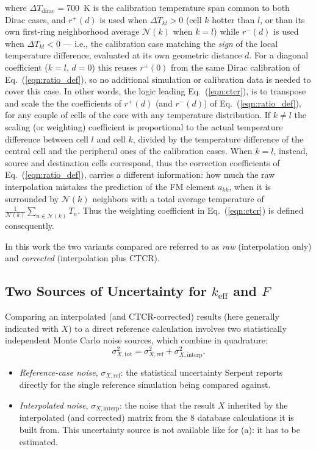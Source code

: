 \documentclass{style/nseJournal}
\begin{document}
where $\Delta T_{\text{dirac}} = 700$~K is the calibration temperature span common to both Dirac cases, and $r^{+}(d)$ is used when $\Delta T_{kl}>0$ (cell $k$ hotter than $l$, or than its own first-ring neighborhood average $\mathcal{N}(k)$ when $k=l$) while $r^{-}(d)$ is used when $\Delta T_{kl}<0$ --- i.e., the calibration case matching the \emph{sign} of the local temperature difference, evaluated at its own geometric distance $d$. For a diagonal coefficient ($k=l$, $d=0$) this reuses $r^{\pm}(0)$ from the same Dirac calibration of Eq.~(\ref{eqn:ratio_def}), so no additional simulation or calibration data is needed to cover this case.
In other words, the logic leading Eq.~(\ref{eqn:ctcr}), is to transpose and scale the the coefficients of $r^+(d)$ (and $r^-(d)$) of Eq.~(\ref{eqn:ratio_def}), for any couple of cells of the core with any temperature distribution. If $k\neq l$ the scaling (or weighting) coefficient is proportional to the actual temperature difference between cell $l$ and cell $k$, divided by the temperature difference of the central cell and the peripheral ones of the calibration cases. When $k=l$, instead, source and destination cells correspond, thus the correction coefficients of Eq.~(\ref{eqn:ratio_def}), carries a different information: how much the raw interpolation mistakes the prediction of the FM element $a_{kk}$, when it is surrounded by $\mathcal{N}(k)$ neighbors with a total average temperature of $\frac{1}{\mathcal{N}(k)} \displaystyle\sum_{n\in\mathcal{N}(k)}T_n$. Thus the weighting coefficient in Eq.~(\ref{eqn:ctcr}) is defined consequently. 

In this work the two variants compared are referred to as \emph{raw} (interpolation only) and \emph{corrected} (interpolation plus CTCR).


\subsection{Two Sources of Uncertainty for $k_\text{eff}$ and $F$}
\label{sec:uncertainty}

Comparing an interpolated (and CTCR-corrected) results (here generally indicated with $X$) to a direct reference calculation involves two statistically independent Monte Carlo noise sources, which combine in quadrature:
\begin{equation}
  \sigma_{X,\text{tot}}^2 = \sigma_{X,\text{ref}}^2 + \sigma_{X,\text{interp}}^2 .
  \label{eqn:sigma_tot}
\end{equation}

\begin{itemize}
  \item[(a)] \emph{Reference-case noise}, $\sigma_{X,\text{ref}}$: the statistical uncertainty Serpent reports directly for the single reference simulation being compared against. 
  
  \item[(b)] \emph{Interpolated noise}, $\sigma_{X,\text{interp}}$: the noise that the result $X$ inherited by the interpolated (and corrected) matrix from the 8 database calculations it is built from. This uncertainty source is not available like for (a): it has to be estimated. %
\end{itemize}
\end{document}
